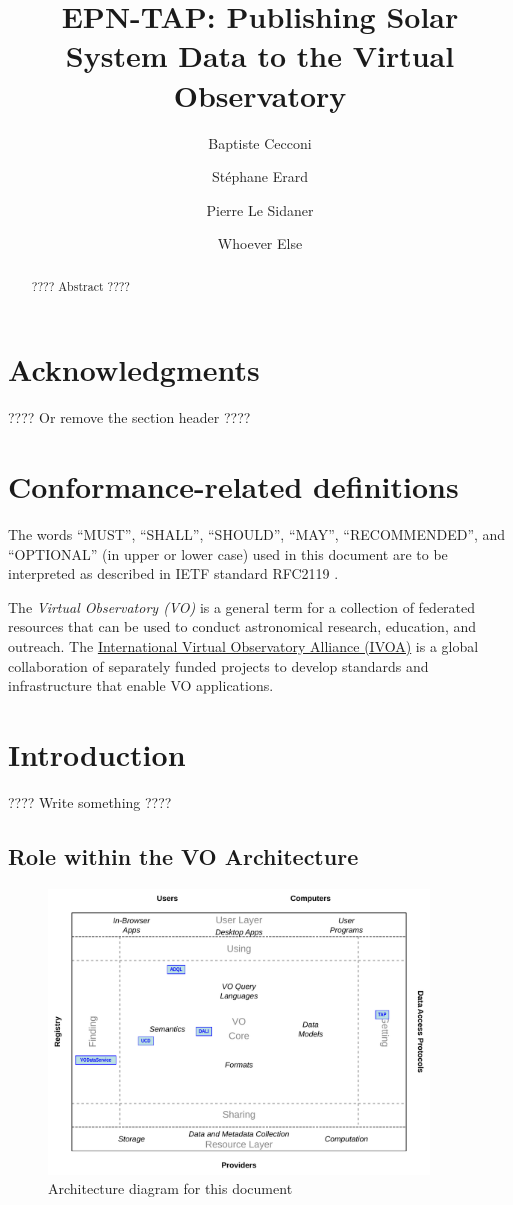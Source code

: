 \documentclass[11pt,a4paper]{ivoa}
\title{EPN-TAP: Publishing Solar System Data to the Virtual Observatory}
\author{Baptiste Cecconi}
\author{Stéphane Erard}
\author{Pierre Le Sidaner}
\author{Whoever Else}
\begin{document}
\begin{abstract}
???? Abstract ????
\end{abstract}


\section*{Acknowledgments}

???? Or remove the section header ????

\section*{Conformance-related definitions}

The words ``MUST'', ``SHALL'', ``SHOULD'', ``MAY'', ``RECOMMENDED'', and
``OPTIONAL'' (in upper or lower case) used in this document are to be
interpreted as described in IETF standard RFC2119 \citep{std:RFC2119}.

The \emph{Virtual Observatory (VO)} is a
general term for a collection of federated resources that can be used
to conduct astronomical research, education, and outreach.
The \href{http://www.ivoa.net}{International
Virtual Observatory Alliance (IVOA)} is a global
collaboration of separately funded projects to develop standards and
infrastructure that enable VO applications.


\section{Introduction}

???? Write something ????

\subsection{Role within the VO Architecture}

\begin{figure}
\centering

\includegraphics[width=0.9\textwidth]{role_diagram.pdf}
\caption{Architecture diagram for this document}
\label{fig:archdiag}
\end{figure}
\end{document}
